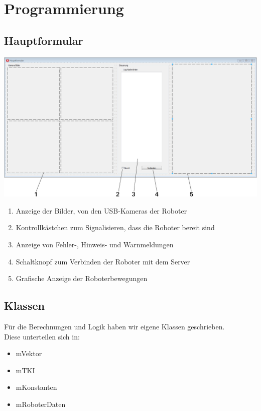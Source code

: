 \section{Programmierung}




\subsection{Hauptformular}
\begin{center}
	\includegraphics[width=\textwidth]{Bilder/GUI.pdf}
\end{center}
\begin{enumerate}
	\item Anzeige der Bilder, von den USB-Kameras der Roboter 
	\item Kontrollkästchen zum Signalisieren, dass die Roboter bereit sind
	\item Anzeige von Fehler-, Hinweis- und Warnmeldungen
	\item Schaltknopf zum Verbinden der Roboter mit dem Server
	\item Grafische Anzeige der Roboterbewegungen\\
\end{enumerate}


\subsection{Klassen}
Für die Berechnungen und Logik haben wir eigene Klassen geschrieben.\\
\newline
Diese unterteilen sich in:
\begin{itemize}
	\item mVektor
	\item mTKI
	\item mKonstanten
	\item mRoboterDaten
\end{itemize}
